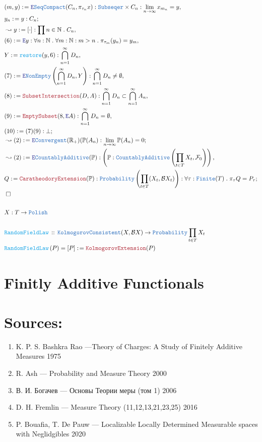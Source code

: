 \documentclass[12pt]{scrartcl}
\newcommand{\TYPE}[1]{\textcolor{NavyBlue}{\mathtt{#1}}}
\newcommand{\FUNC}[1]{\textcolor{Cerulean}{\mathtt{#1}}}
\newcommand{\LOGIC}[1]{\textcolor{Blue}{\mathtt{#1}}}
\newcommand{\THM}[1]{\textcolor{Maroon}{\mathtt{#1}}}
\renewcommand{\.}{\; . \;}
\newcommand{\de}{: \kern 0.1pc =}
\newcommand{\Act}[1]{\left( #1 \right)}
\newcommand{\DeclareFunc}[2]{& \FUNC{#1} \, :: \, #2 \\}
\newcommand{\DefineNamedFunc}[4]{&  \FUNC{#1}\Act{#2} = #3 \de #4 \\}
\newcommand{\Page}[1]{ \begin{align*} #1 \end{align*}   }
\newcommand{\Reals}{\mathbb{R} }
\newcommand{\Nat}{\mathbb{N} }
\newcommand{\Say}[3]{& #1 \de #2 : #3, \\}
\newcommand{\Conclude}[3]{& #1 \de #2 : #3; \\}
\newcommand{\Derive}[3]{& \leadsto #1 \de #2 : #3, \\}
\newcommand{\DeriveConclude}[3]{& \leadsto #1 \de #2 : #3 ; \\}
\newcommand{\ByDef}{\LOGIC{E}}
\newcommand{\QED}{\; \square}
\newcommand{\EndProof}{& \QED \\}
\newcommand{\B}{\mathcal{B}}
\newcommand{\F}{\mathcal{F}}
\begin{document}
\newpage
\Page{
\Say{(m,y)}{ \ByDef\TYPE{SeqCompact}(C_n, \pi_{\tau_n} x )   }{ \TYPE{Subseqer} \times C_n : \lim_{n \to \infty} x_{m_n} = y }
\Conclude{y_n}{y}{C_n}
\Derive{y}{[\cdot]}{\prod n \in \Nat \. C_n}
\Say{(6)}{\ByDef y  }{  \forall n : \Nat \. \forall m : \Nat : m > n \. \pi_{\tau_m}(y_n) = y_m  }
\Say{ Y }{\FUNC{restore}(y,6)}{ \bigcap^\infty_{n =1 } D_n  }
\Say{ (7) }{ \ByDef\TYPE{NonEmpty}\left( \bigcap^\infty_{n = 1} D_n, Y \right)    }{ \bigcap^\infty_{n = 1} D_n \neq \emptyset }
\Say{ (8) }{ \THM{SubsetIntersection}(D,A)}{ \bigcap^\infty_{n = 1} D_n \subset \bigcap^\infty_{n = 1} A_n   }
\Say{(9)}{ \THM{EmptySubset}(8, \ByDef A) }{ \bigcap^\infty_{n = 1} D_n = \emptyset }
\Conclude{(10)}{(7)(9)}{ \bot }
\DeriveConclude{ (2)  }{ \ByDef\TYPE{Convergent}(\Reals_+)( \mathbb{P}(A_n )}{ \lim_{n \to \infty} \mathbb{P}(A_n) = 0 }
\Derive{ (2) }{ \ByDef\TYPE{CountablyAdditive}(\mathbb{P}) }{ \left( \mathbb{P} : \TYPE{CountablyAdditive}\left( \prod_{t \in T} X_t, \F_0 \right) \right) }
\Conclude{ Q  }{\THM{CaratheodoryExtension}(\mathbb{P}) }{ \TYPE{Probability} \left( \prod_{t \in T} (X_t, \B X_t) \right)
: \forall \tau : \TYPE{Finite}(T) \. \pi_{\tau} Q = P_\tau
}
\EndProof
\\
& X : T \to \TYPE{Polish} \\
\\
\DeclareFunc{ RandomFieldLaw  }{ \TYPE{KolmogorovConsistent}(X, \B X) \to  \TYPE{Probability} \prod_{t \in T} X_t  }
\DefineNamedFunc{ RandomFieldLaw  }{ P }{[P]}{ \THM{ KolmogorovExtension  }(P) }
}
\newpage
\section{Finitly Additive Functionals}
\newpage
\section*{Sources:}
\begin{enumerate}
\item K. P. S. Bashkra Rao ---Theory of Charges: A Study of Finitely Additive Measures 1975
\item  R. Ash     --- Probability and Measure Theory 2000
\item  В. И. Богачев --- Основы Теории меры (том 1) 2006 
\item  D. H. Fremlin --- Measure Theory (11,12,13,21,23,25) 2016
\item P. Bouafia, T. De Pauw ---  Localizable Locally Determined Measurable spaces with Neglidgibles 2020
\end{enumerate}
\end{document}
